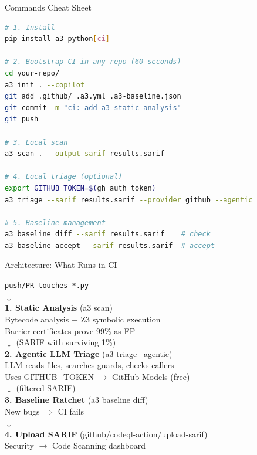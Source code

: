 \documentclass[aspectratio=169]{beamer}
\begin{document}
\begin{frame}[fragile]{Commands Cheat Sheet}
\begin{lstlisting}[language=bash]
# 1. Install
pip install a3-python[ci]

# 2. Bootstrap CI in any repo (60 seconds)
cd your-repo/
a3 init . --copilot
git add .github/ .a3.yml .a3-baseline.json
git commit -m "ci: add a3 static analysis"
git push

# 3. Local scan
a3 scan . --output-sarif results.sarif

# 4. Local triage (optional)
export GITHUB_TOKEN=$(gh auth token)
a3 triage --sarif results.sarif --provider github --agentic

# 5. Baseline management
a3 baseline diff --sarif results.sarif    # check
a3 baseline accept --sarif results.sarif  # accept
\end{lstlisting}
\end{frame}

\begin{frame}{Architecture: What Runs in CI}
\begin{center}
\begin{minipage}{0.85\textwidth}
\texttt{push/PR touches *.py} \\
\quad $\downarrow$ \\
\textbf{1. Static Analysis} (a3 scan) \\
\quad Bytecode analysis + Z3 symbolic execution \\
\quad Barrier certificates prove 99\% as FP \\
\quad $\downarrow$ (SARIF with surviving 1\%) \\
\textbf{2. Agentic LLM Triage} (a3 triage --agentic) \\
\quad LLM reads files, searches guards, checks callers \\
\quad Uses GITHUB\_TOKEN $\to$ GitHub Models (free) \\
\quad $\downarrow$ (filtered SARIF) \\
\textbf{3. Baseline Ratchet} (a3 baseline diff) \\
\quad New bugs $\Rightarrow$ CI fails \\
\quad $\downarrow$ \\
\textbf{4. Upload SARIF} (github/codeql-action/upload-sarif) \\
\quad Security $\to$ Code Scanning dashboard
\end{minipage}
\end{center}
\end{frame}
\end{document}
